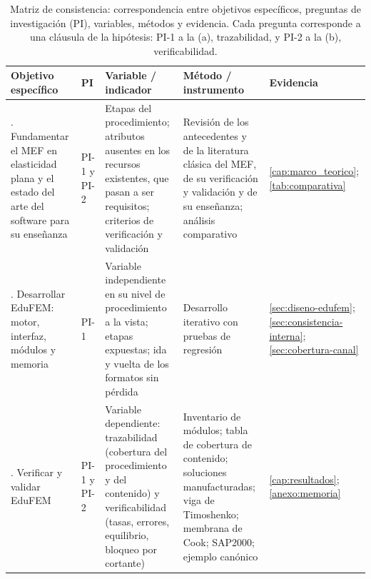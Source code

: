 \begin{table}[htbp]
\centering
\caption[Matriz de consistencia de la investigación.]{Matriz de consistencia: correspondencia entre objetivos específicos, preguntas de investigación (PI), variables, métodos y evidencia. Cada pregunta corresponde a una cláusula de la hipótesis: PI-1 a la (a), trazabilidad, y PI-2 a la (b), verificabilidad.}
\label{tab:consistencia}
{\footnotesize
\setlength{\tabcolsep}{3pt}
\renewcommand{\arraystretch}{1.15}
\begin{tabular}{@{}>{\raggedright\arraybackslash}p{3.0cm}>{\raggedright\arraybackslash}p{1.3cm}>{\raggedright\arraybackslash}p{3.0cm}>{\raggedright\arraybackslash}p{3.6cm}>{\raggedright\arraybackslash}p{2.7cm}@{}}
\toprule
\textbf{Objetivo específico} & \textbf{PI} & \textbf{Variable / indicador} & \textbf{Método / instrumento} & \textbf{Evidencia} \\
\midrule
1. Fundamentar el MEF en elasticidad plana y el estado del arte del software para su enseñanza & PI-1 y PI-2 & Etapas del procedimiento; atributos ausentes en los recursos existentes, que pasan a ser requisitos; criterios de verificación y validación & Revisión de los antecedentes y de la literatura clásica del MEF, de su verificación y validación y de su enseñanza; análisis comparativo & \autoref{cap:marco_teorico}; \autoref{tab:comparativa} \\
2. Desarrollar EduFEM: motor, interfaz, módulos y memoria & PI-1 & Variable independiente en su nivel de procedimiento a la vista; etapas expuestas; ida y vuelta de los formatos sin pérdida & Desarrollo iterativo con pruebas de regresión & \autoref{sec:diseno-edufem}; \autoref{sec:consistencia-interna}; \autoref{sec:cobertura-canal} \\
3. Verificar y validar EduFEM & PI-1 y PI-2 & Variable dependiente: trazabilidad (cobertura del procedimiento y del contenido) y verificabilidad (tasas, errores, equilibrio, bloqueo por cortante) & Inventario de módulos; tabla de cobertura de contenido; soluciones manufacturadas; viga de Timoshenko; membrana de Cook; SAP2000; ejemplo canónico & \autoref{cap:resultados}; \autoref{anexo:memoria} \\
\bottomrule
\end{tabular}}
\end{table}

